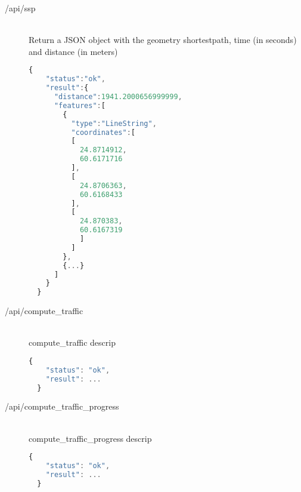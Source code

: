 \begin{description}
  \item[/api/ssp] \hfill \\ 
    Return a JSON object with the geometry shortestpath, 
    time (in seconds) and distance (in meters) \\
    \begin{lstlisting}[language=javascript]
  {
    "status":"ok",
    "result":{
      "distance":1941.2000656999999,
      "features":[
        {
          "type":"LineString",
          "coordinates":[
          [
            24.8714912,
            60.6171716
          ],
          [
            24.8706363,
            60.6168433
          ],
          [
            24.870383,
            60.6167319
            ]
          ]
        },
        {...}
      ]
    }
  }
    \end{lstlisting}
  \item[/api/compute\_traffic] \hfill \\ 
    compute\_traffic descrip \\
    \begin{lstlisting}[language=javascript]
  {
    "status": "ok",
    "result": ...
  }
    \end{lstlisting}
  \item[/api/compute\_traffic\_progress] \hfill \\ 
    compute\_traffic\_progress descrip \\
    \begin{lstlisting}[language=javascript]
  {
    "status": "ok",
    "result": ...
  }
    \end{lstlisting}
  
\end{description}



